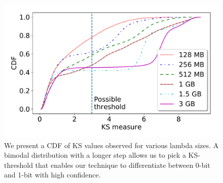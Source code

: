 \begin{figure}[!t]
  \includegraphics[width=.99\linewidth]{fig/ksvalues.pdf}
  \caption{We present a CDF of KS values observed for various lambda sizes. A bimodal distribution 
  with a longer step allows us to pick a KS-threshold that enables our technique to differentiate 
  between 0-bit and 1-bit with high confidence. 
\label{fig:ks_values}}
\end{figure}


